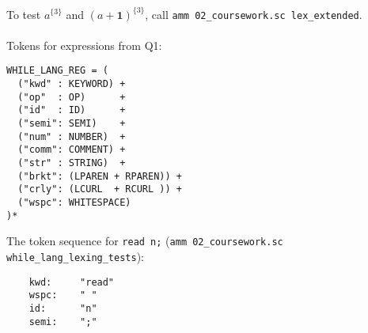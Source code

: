 \documentclass[english]{scrartcl}
\begin{document}
To test $a^{\{3\}}$ and $(a+\textbf{1})^{\{3\}}$, call \verb|amm 02_coursework.sc lex_extended|.\\
\\
Tokens for expressions from Q1:
\begin{verbatim}
WHILE_LANG_REG = (
  ("kwd" : KEYWORD) +
  ("op"  : OP)      +
  ("id"  : ID)      +
  ("semi": SEMI)    +
  ("num" : NUMBER)  +
  ("comm": COMMENT) +
  ("str" : STRING)  +
  ("brkt": (LPAREN + RPAREN)) +
  ("crly": (LCURL  + RCURL )) +
  ("wspc": WHITESPACE)
)*
\end{verbatim}

The token sequence for \verb|read n;| (\verb|amm 02_coursework.sc while_lang_lexing_tests|):
\begin{verbatim}
    kwd:     "read"
    wspc:    " "
    id:      "n"
    semi:    ";"
\end{verbatim}

\end{document}
